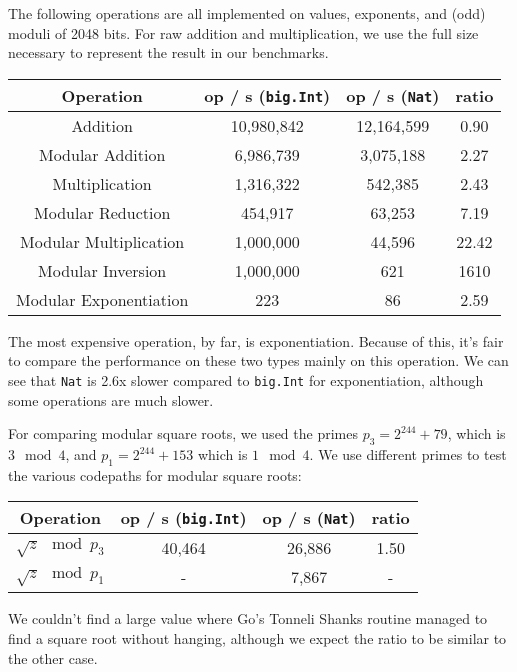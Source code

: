 \documentclass[11pt, a4paper]{article} %
\begin{document}
{The following operations are all implemented on values, exponents,
and (odd) moduli of 2048 bits. For raw addition and multiplication,
we use the full size necessary to represent the result in our benchmarks.

\begin{center}
 \begin{tabular}{|c | c | c | c|} 
 \hline
 Operation & op / s (\texttt{big.Int}) & op / s (\texttt{Nat}) & ratio \\ [0.5ex] 
 \hline\hline
 Addition & 10,980,842 & 12,164,599 & 0.90 \\
 \hline
 Modular Addition & 6,986,739 & 3,075,188 & 2.27 \\
 \hline
 Multiplication & 1,316,322 & 542,385 & 2.43 \\
 \hline
 Modular Reduction & 454,917 & 63,253 & 7.19 \\
 \hline
 Modular Multiplication & 1,000,000 & 44,596 & 22.42 \\
 \hline
 Modular Inversion & 1,000,000 & 621 & 1610 \\
 \hline
 Modular Exponentiation & 223 & 86 & 2.59 \\
 \hline
\end{tabular}
\end{center}

The most expensive operation, by far, is exponentiation. Because
of this, it's fair to compare the performance on these two types
mainly on this operation. We can see that \texttt{Nat} is 2.6x slower
compared to \texttt{big.Int} for exponentiation, although
some operations are much slower.

For comparing modular square roots, we used the primes
$p_3 = 2^{244} + 79$, which is $3 \mod 4$,
and $p_1 = 2^{244} + 153$ which is $1 \mod 4$. We use different primes
to test the various codepaths for modular square roots:

\begin{center}
 \begin{tabular}{|c | c | c | c|} 
 \hline
 Operation & op / s (\texttt{big.Int}) & op / s (\texttt{Nat}) & ratio \\ [0.5ex] 
 \hline\hline
 $\sqrt{z} \mod p_3$ & 40,464 & 26,886 & 1.50 \\
 \hline
 $\sqrt{z} \mod p_1$ & - & 7,867 & - \\
 \hline
\end{tabular}
\end{center}

We couldn't find a large value where Go's Tonneli Shanks routine
managed to find a square root without hanging, although we
expect the ratio to be similar to the other case.

}
\end{document}

